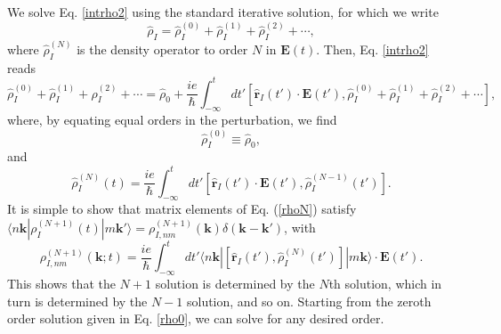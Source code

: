 
We solve Eq. \eqref{intrho2} using the standard iterative
solution, for which we write
\begin{equation}\label{rhop}
\hat{\rho}_{I} = \hat{\rho}_{I}^{(0)} + \hat{\rho}_{I}^{(1)} + \hat{\rho}_{I}^{(2)} + \cdots
,
\end{equation}
where $\hat{\rho}_{I}^{(N)}$ is the density operator to order $N$ in $\mathbf{E}(t)$.
Then, Eq. \eqref{intrho2} reads
\begin{equation}\label{intrho3}
\hat{\rho}_{I}^{(0)} + \hat{\rho}_{I}^{(1)} + \hat{\rho}_{I}^{(2)} + \cdots
= \hat{\rho}_{0}
+
\frac{ie}{\hbar}\int_{-\infty}^t dt'[\hat{\mathbf{r}}_{I}(t')\cdot\mathbf{E}(t'),
\hat{\rho}_{I}^{(0)}+\hat{\rho}_{I}^{(1)}+\hat{\rho}_{I}^{(2)}+\cdots
]
,
\end{equation}
where, by equating equal orders in the perturbation, we find
\begin{equation}\label{rho0}
\hat{\rho}_{I}^{(0)}\equiv\hat{\rho}_{0}
,
\end{equation}
and
\begin{equation}\label{rhoN}
\hat{\rho}_{I}^{(N)}(t)=
\frac{ie}{\hbar}
\int_{-\infty}^t dt'[\hat{\mathbf{r}}_{I}(t')\cdot\mathbf{E}(t'),\hat{\rho}^{(N-1)}_{I}(t')].
\end{equation}
It is simple to show that matrix elements of Eq. (\ref{rhoN}) satisfy
$\langle n\mathbf{k}| \rho_{I}^{(N+1)}(t) |m\mathbf{k}'\rangle = \rho^{(N+1)}_{I,nm}(\mathbf{k})\delta(\mathbf{k}-\mathbf{k}')$,
with
\begin{equation}\label{rtilde}
\rho^{(N+1)}_{I,nm}(\mathbf{k};t)
=\frac{ie}{\hbar}\int_{-\infty}^t dt'
\langle n\mathbf{k}|
[\hat{\mathbf{r}}_{I}(t'),\hat{\rho}^{(N)}_{I}(t')]
|m\mathbf{k}\rangle
\cdot\mathbf{E}(t').
\end{equation}
This shows that the $N + 1$ solution is determined by the $N$th solution, which
in turn is determined by the $N - 1$ solution, and so on. Starting from the
zeroth order solution given in Eq. \eqref{rho0}, we can solve for any desired
order.


